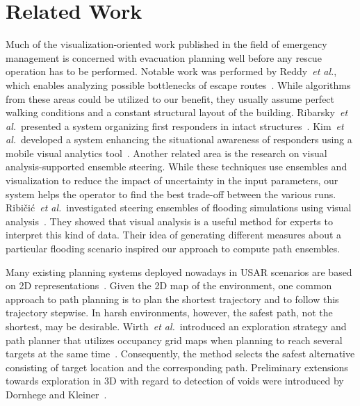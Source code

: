 \documentclass[conference,10pt,letter]{IEEEtran}
\def\etal{\textit{et al.}}
\begin{document}

\section{Related Work} \label{sec:relatedwork}
 Much of the visualization-oriented work published in the field of emergency management is concerned with evacuation planning well before any rescue operation has to be performed. Notable work was performed by Reddy~\etal, which enables analyzing possible bottlenecks of escape routes~\cite{EuroVA12:13-17:2012}. While algorithms from these areas could be utilized to our benefit, they usually assume perfect walking conditions and a constant structural layout of the building. Ribarsky~\etal\ presented a system organizing first responders in intact structures~\cite{Ribarsky:2010}. Kim~\etal\ developed a system enhancing the situational awareness of responders using a mobile visual analytics tool~\cite{Kim:2008}. Another related area is the research on visual analysis-supported ensemble steering. While these techniques use ensembles and visualization to reduce the impact of uncertainty in the input parameters, our system helps the operator to find the best trade-off between the various runs. Ribi\v{c}i\'c~\etal\ investigated steering ensembles of flooding simulations using visual analysis~\cite{6280550}. They showed that visual analysis is a useful method for experts to interpret this kind of data. Their idea of generating different measures about a particular flooding scenario inspired our approach to compute path ensembles. 

Many existing planning systems deployed nowadays in USAR scenarios are based on 2D representations~\cite{kleiner_et_al_ssrr09,KohlbrecherMeyerStrykKlingaufFlexibleSlamSystem2011,Pellenz2009SMU}. Given the 2D map of the environment, one common approach to path planning is to plan the shortest trajectory and to follow this trajectory stepwise. In harsh environments, however, the safest path, not the shortest, may be desirable. Wirth~\etal\ introduced an exploration strategy and path planner that utilizes occupancy grid maps when planning to reach several targets at the same time~\cite{Wirth2007ETA1}. Consequently, the method selects the safest alternative consisting of target location and the corresponding path. Preliminary extensions towards exploration in 3D with regard to detection of voids were introduced by Dornhege and Kleiner~\cite{dornhege2011frontier}.
\end{document}
